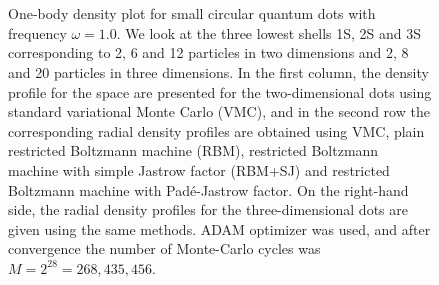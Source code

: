 \begin{figure}[H]
	\centering
	\captionsetup[subfigure]{labelformat=empty}
	\hspace{0.1cm}
	\hspace{-0.5cm}
	\hspace{-0.5cm}
	\\ [-0.5cm]
	
	\hspace{0.1cm}
	\hspace{-0.5cm}
	\hspace{-0.5cm}
	\\ [-0.5cm]
	
	\hspace{0.1cm}
	\hspace{-0.5cm}
	\hspace{-0.5cm}
	
	\caption{One-body density plot for small circular quantum dots with frequency $\omega=1.0$. We look at the three lowest shells 1S, 2S and 3S corresponding to 2, 6 and 12 particles in two dimensions and 2, 8 and 20 particles in three dimensions. In the first column, the density profile for the space are presented for the two-dimensional dots using standard variational Monte Carlo (VMC), and in the second row the corresponding radial density profiles are obtained using VMC, plain restricted Boltzmann machine (RBM), restricted Boltzmann machine with simple Jastrow factor (RBM+SJ) and restricted Boltzmann machine with Padé-Jastrow factor. On the right-hand side, the radial density profiles for the three-dimensional dots are given using the same methods. ADAM optimizer was used, and after convergence the number of Monte-Carlo cycles was $M=2^{28}=268,435,456$.}
	\label{fig:OB_interaction_23D}
\end{figure}

